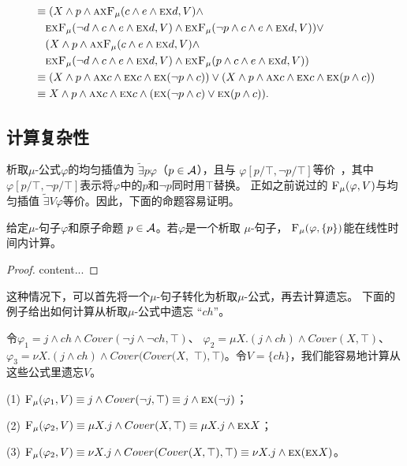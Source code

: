 \begin{example}
\begin{align*}
		& \equiv (X \wedge p \wedge \textsc{a}\textsc{x}{\textsc{F}_{\textsc{$\mu$}}}(c \wedge e \wedge \textsc{e}\textsc{x} d, V) \wedge\\
		& \quad\textsc{e}\textsc{x}{\textsc{F}_{\textsc{$\mu$}}}(\neg d \wedge c \wedge e \wedge \textsc{e}\textsc{x} d, V) \wedge  \textsc{e}\textsc{x}{\textsc{F}_{\textsc{$\mu$}}}(\neg p \wedge c \wedge e \wedge \textsc{e}\textsc{x} d, V) )\vee \\
		& \quad (X \wedge p \wedge \textsc{a}\textsc{x}{\textsc{F}_{\textsc{$\mu$}}}(c \wedge e \wedge \textsc{e}\textsc{x} d, V) \wedge\\
		& \quad\textsc{e}\textsc{x}{\textsc{F}_{\textsc{$\mu$}}}(\neg d \wedge c \wedge e \wedge \textsc{e}\textsc{x} d, V) \wedge  \textsc{e}\textsc{x}{\textsc{F}_{\textsc{$\mu$}}}( p \wedge c \wedge e \wedge \textsc{e}\textsc{x} d, V)) \\
		& \equiv (X \wedge p \wedge \textsc{a}\textsc{x} c \wedge \textsc{e}\textsc{x} c \wedge \textsc{e}\textsc{x} (\neg p \wedge c)) \vee 
		(X \wedge p \wedge \textsc{a}\textsc{x} c \wedge \textsc{e}\textsc{x} c \wedge \textsc{e}\textsc{x} (p \wedge c)) \\
		& \equiv X \wedge p \wedge \textsc{a}\textsc{x} c \wedge \textsc{e}\textsc{x} c \wedge (\textsc{e}\textsc{x} (\neg p \wedge c) \vee \textsc{e}\textsc{x} (p \wedge c)).
	\end{align*}
\end{example}

\subsection{计算复杂性}
析取$\mu$-公式$\varphi$的均匀插值为 $\widetilde{\exists}p \varphi$（$p\in {\cal A}$），且与 $\varphi[p/\top,\neg p/\top]$等价~\cite{d2006modal}，其中$\varphi[p/\top,\neg p/\top]$表示将$\varphi$中的$p$和$\neg p$同时用$\top$替换。
正如之前说过的 ${\textsc{F}_{\textsc{$\mu$}}}(\varphi, V)$与均匀插值 $\widetilde{\exists}V \varphi$等价\cite{d2006modal}。因此，下面的命题容易证明。
\begin{corollary}\label{pro:disLiT}
	给定$\mu$-句子$\varphi$和原子命题 $p\in {\cal A}$。若$\varphi$是一个析取 $\mu$-句子， ${\textsc{F}_{\textsc{$\mu$}}}(\varphi, \{p\})$能在线性时间内计算。
\end{corollary}
\begin{proof}
	content...
\end{proof}

这种情况下，可以首先将一个$\mu$-句子转化为析取$\mu$-公式，再去计算遗忘。
下面的例子给出如何计算从析取$\mu$-公式中遗忘 “$ch$”。
\begin{example}
	令$\varphi_1=  j \wedge ch \wedge Cover(\neg j \wedge \neg ch, \top)$、 $\varphi_2= \mu X. (j \wedge ch) \wedge Cover(X, \top)$、 $\varphi_3=  \nu X. (j \wedge ch) \wedge Cover(Cover(X,$ $\top), \top)$。令$V=\{ch\}$，我们能容易地计算从这些公式里遗忘$V$。
	
	(1) ${\textsc{F}_{\textsc{$\mu$}}}(\varphi_1, V) \equiv j \wedge Cover(\neg j, \top) \equiv j \wedge \textsc{e} \textsc{x}(\neg j)$；
	
	(2) ${\textsc{F}_{\textsc{$\mu$}}}(\varphi_2, V) \equiv \mu X. j  \wedge Cover(X, \top) \equiv \mu X. j \wedge \textsc{e} \textsc{x} X$；
	
	(3) ${\textsc{F}_{\textsc{$\mu$}}}(\varphi_2, V) \equiv \nu X. j \wedge Cover(Cover(X, \top), \top) \equiv \nu X. j \wedge \textsc{e} \textsc{x}(\textsc{e} \textsc{x} X)$。
\end{example}

